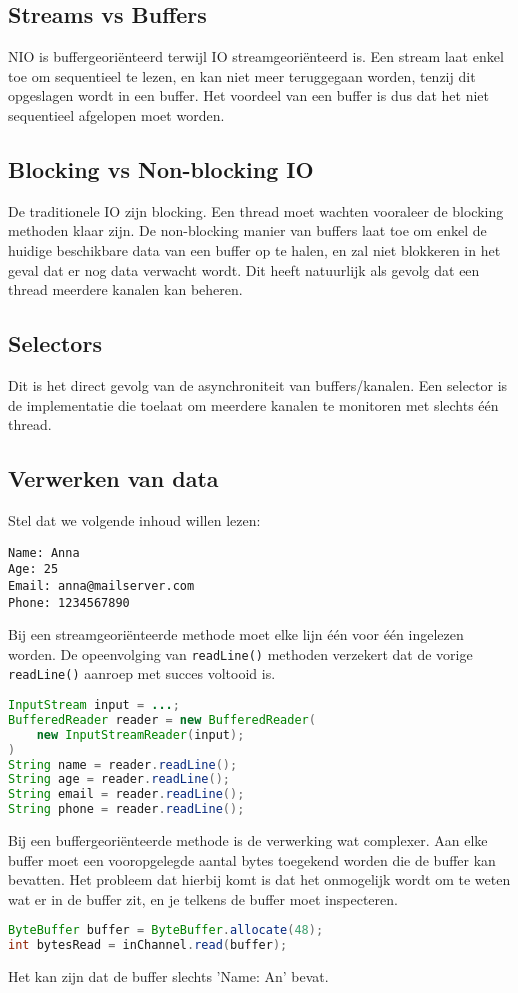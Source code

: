 \documentclass{report}
\begin{document}
\subsection{Streams vs Buffers}
NIO is buffergeoriënteerd terwijl IO streamgeoriënteerd is. Een stream laat enkel toe om sequentieel te lezen, en kan niet meer teruggegaan worden, tenzij dit opgeslagen wordt in een buffer. Het voordeel van een buffer is dus dat het niet sequentieel afgelopen moet worden. 
\subsection{Blocking vs Non-blocking IO}
De traditionele IO zijn blocking. Een thread moet wachten vooraleer de blocking methoden klaar zijn. De non-blocking manier van buffers laat toe om enkel de huidige beschikbare data van een buffer op te halen, en zal niet blokkeren in het geval dat er nog data verwacht wordt. Dit heeft natuurlijk als gevolg dat een thread meerdere kanalen kan beheren.
\subsection{Selectors}
Dit is het direct gevolg van de asynchroniteit van buffers/kanalen. Een selector is de implementatie die toelaat om meerdere kanalen te monitoren met slechts één thread.
\subsection{Verwerken van data}
Stel dat we volgende inhoud willen lezen:
\begin{lstlisting}
Name: Anna
Age: 25
Email: anna@mailserver.com
Phone: 1234567890
\end{lstlisting}
Bij een streamgeoriënteerde methode moet elke lijn één voor één ingelezen worden. De opeenvolging van \texttt{readLine()} methoden verzekert dat de vorige \texttt{readLine()} aanroep met succes voltooid is.
\begin{lstlisting}[language=java]
InputStream input = ...;
BufferedReader reader = new BufferedReader(
	new InputStreamReader(input);
)
String name = reader.readLine();
String age = reader.readLine();
String email = reader.readLine();
String phone = reader.readLine();
\end{lstlisting}
Bij een buffergeoriënteerde methode is de verwerking wat complexer. Aan elke buffer moet een vooropgelegde aantal bytes toegekend worden die de buffer kan bevatten. Het probleem dat hierbij komt is dat het onmogelijk wordt om te weten wat er in de buffer zit, en je telkens de buffer moet inspecteren.
\begin{lstlisting}[language=java]
ByteBuffer buffer = ByteBuffer.allocate(48);
int bytesRead = inChannel.read(buffer);
\end{lstlisting}
Het kan zijn dat de buffer slechts 'Name: An' bevat.
\end{document}
